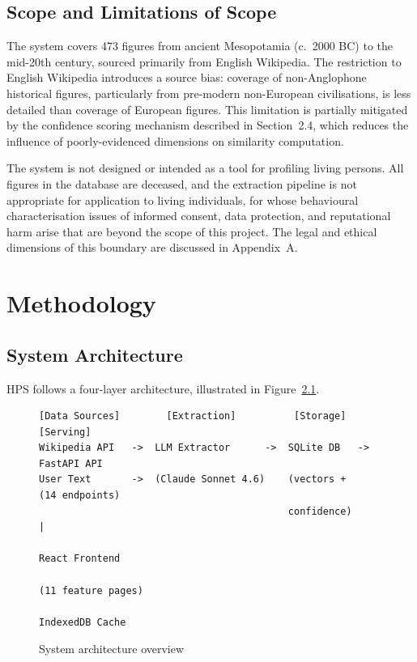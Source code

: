 \documentclass[11pt, a4paper]{report}
\begin{document}
\section{Scope and Limitations of Scope}

The system covers 473 figures from ancient Mesopotamia (c.\ 2000 BC) to the mid-20th century, sourced primarily from English Wikipedia. The restriction to English Wikipedia introduces a source bias: coverage of non-Anglophone historical figures, particularly from pre-modern non-European civilisations, is less detailed than coverage of European figures. This limitation is partially mitigated by the confidence scoring mechanism described in Section~2.4, which reduces the influence of poorly-evidenced dimensions on similarity computation.

The system is not designed or intended as a tool for profiling living persons. All figures in the database are deceased, and the extraction pipeline is not appropriate for application to living individuals, for whose behavioural characterisation issues of informed consent, data protection, and reputational harm arise that are beyond the scope of this project. The legal and ethical dimensions of this boundary are discussed in Appendix~A.

\chapter{Methodology}

\section{System Architecture}

HPS follows a four-layer architecture, illustrated in Figure~\ref{fig:architecture}.

\begin{figure}[H]
  \centering
  \begin{lstlisting}
[Data Sources]        [Extraction]          [Storage]       [Serving]
Wikipedia API   ->  LLM Extractor      ->  SQLite DB   ->  FastAPI API
User Text       ->  (Claude Sonnet 4.6)    (vectors +       (14 endpoints)
                                           confidence)           |
                                                          React Frontend
                                                          (11 feature pages)
                                                          IndexedDB Cache
  \end{lstlisting}
  \caption{System architecture overview}
  \label{fig:architecture}
\end{figure}
\end{document}
